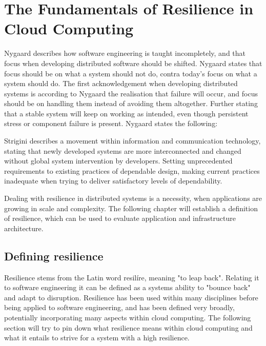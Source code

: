 \chapter{The Fundamentals of Resilience in Cloud Computing}
\label{ch:resillience}

Nygaard describes how software engineering is taught incompletely, and that focus when developing distributed software should be shifted. Nygaard states that focus should be on what a system should not do, contra today's focus on what a system should do. The first acknowledgement when developing distributed systems is according to Nygaard the realisation that failure will occur, and focus should be on handling them instead of avoiding them altogether. Further stating that a stable system will keep on working as intended, even though persistent stress or component failure is present. Nygaard states the following\cite[p. 27]{nygard2007release}:


Strigini describes a movement within information and communication technology, stating that newly developed systems are more interconnected and changed without global system intervention by developers. Setting unprecedented requirements to existing practices of dependable design, making current practices inadequate when trying to deliver satisfactory levels of dependability\cite[p. 5]{strigini2012fault}.


Dealing with resilience in distributed systems is a necessity, when applications are growing in scale and complexity. The following chapter will establish a definition of resilience, which can be used to evaluate application and infrastructure architecture. 

\section{Defining resilience}
Resilience stems from the Latin word resilíre, meaning "to leap back". Relating it to software engineering it can be defined as a systems ability to "bounce back" and adapt to disruption\cite{omer2013resilience}. Resilience has been used within many disciplines before being applied to software engineering, and has been defined very broadly, potentially incorporating many aspects within cloud computing. The following section will try to pin down what resilience means within cloud computing and what it entails to strive for a system with a high resilience.


